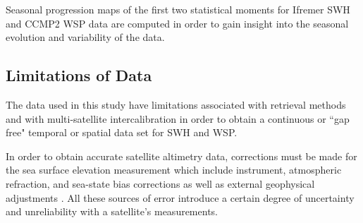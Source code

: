 \documentclass[draft,linenumbers]{agujournal2018}
\begin{document}
Seasonal progression maps of the first two statistical moments for Ifremer SWH and CCMP2 WSP data are computed in order to gain insight into the seasonal evolution and variability of the data.

\subsection{Limitations of Data}

The data used in this study have limitations associated with retrieval methods and with multi-satellite intercalibration in order to obtain a continuous or ``gap free" temporal or spatial data set for SWH and WSP. 

In order to obtain accurate satellite altimetry data, corrections must be made for the sea surface elevation measurement which include instrument, atmospheric refraction, and sea-state bias corrections as well as external geophysical adjustments \cite{fu2000satellite}. All these sources of error introduce a certain degree of uncertainty and unreliability with a satellite's measurements.  
\end{document}
